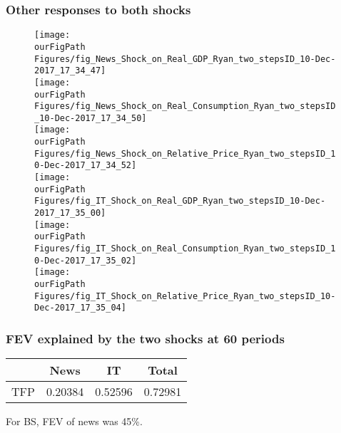 \documentclass{beamer}
\def \ourFigPath {../../}
\begin{document}
\begin{frame}
\frametitle{Other responses to both shocks}

\vspace{-0.2cm}
\begin{figure}
\begin{multicols}{2}
\centering 
\texttt{[image: \\ourFigPath Figures/fig\_News\_Shock\_on\_Real\_GDP\_Ryan\_two\_stepsID\_10-Dec-2017\_17\_34\_47]}\\ 
\vspace{0.3cm}
\texttt{[image: \\ourFigPath Figures/fig\_News\_Shock\_on\_Real\_Consumption\_Ryan\_two\_stepsID\_10-Dec-2017\_17\_34\_50]}\\ 
\vspace{0.3cm}
\texttt{[image: \\ourFigPath Figures/fig\_News\_Shock\_on\_Relative\_Price\_Ryan\_two\_stepsID\_10-Dec-2017\_17\_34\_52]}\\ 


\texttt{[image: \\ourFigPath Figures/fig\_IT\_Shock\_on\_Real\_GDP\_Ryan\_two\_stepsID\_10-Dec-2017\_17\_35\_00]}\\
\vspace{0.3cm}
\texttt{[image: \\ourFigPath Figures/fig\_IT\_Shock\_on\_Real\_Consumption\_Ryan\_two\_stepsID\_10-Dec-2017\_17\_35\_02]}\\ 
\vspace{0.3cm}
\texttt{[image: \\ourFigPath Figures/fig\_IT\_Shock\_on\_Relative\_Price\_Ryan\_two\_stepsID\_10-Dec-2017\_17\_35\_04]}\\ 

\end{multicols}
\end{figure}


\end{frame}


\begin{frame}
	\frametitle{FEV explained by the two shocks at 60 periods}


    \hspace{2.25cm}
\begin{large}
	\begin{tabular}{lccc}
	\hline
		& News & IT & Total \\
		\hline
	TFP	           & 0.20384  & 0.52596 & 0.72981  \\
		\hline
	\end{tabular}
\end{large}

\vspace{2cm}

For BS, FEV of news was 45\%.
		 	
\end{frame}
\end{document}
